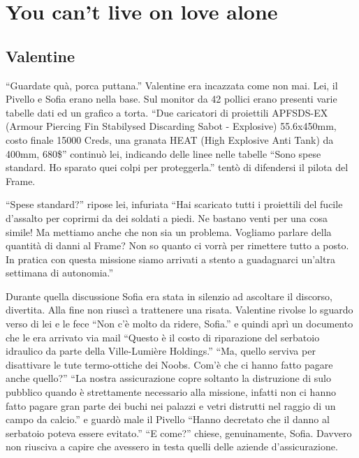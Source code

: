 \chapter{You can't live on love alone}

  \section*{Valentine}

    ``Guardate quà, porca puttana.'' Valentine era incazzata come non mai. Lei, il Pivello e Sofia erano nella base. Sul
    monitor da 42 pollici erano presenti varie tabelle dati ed un grafico a torta. ``Due caricatori di proiettili
    APFSDS-EX (Armour Piercing Fin Stabilysed Discarding Sabot - Explosive) 55.6x450mm, costo finale 15000 Creds, una
    granata HEAT (High Explosive Anti Tank) da 400mm, 680\$'' continuò lei, indicando delle linee nelle tabelle ``Sono
    spese standard. Ho sparato quei colpi per proteggerla.'' tentò di difendersi il pilota del Frame.
    
    ``Spese standard?'' ripose lei, infuriata ``Hai scaricato tutti i proiettili del fucile d'assalto per coprirmi da
    dei soldati a piedi. Ne bastano venti per una cosa simile! Ma mettiamo anche che non sia un problema. Vogliamo
    parlare della quantità di danni al Frame? Non so quanto ci vorrà per rimettere tutto a posto. In pratica con questa
    missione siamo arrivati a stento a guadagnarci un'altra settimana di autonomia.''

    Durante quella discussione Sofia era stata in silenzio ad ascoltare il discorso, divertita. Alla fine non riuscì a
    trattenere una risata. Valentine rivolse lo sguardo verso di lei e le fece ``Non c'è molto da ridere, Sofia.'' e
    quindi aprì un documento che le era arrivato via mail ``Questo è il costo di riparazione del serbatoio idraulico da
    parte della Ville-Lumière Holdings.'' ``Ma, quello serviva per disattivare le tute termo-ottiche dei Noobs. Com'è
    che ci hanno fatto pagare anche quello?'' ``La nostra assicurazione copre soltanto la distruzione di sulo pubblico
    quando è strettamente necessario alla missione, infatti non ci hanno fatto pagare gran parte dei buchi nei palazzi e
    vetri distrutti nel raggio di un campo da calcio.'' e guardò male il Pivello ``Hanno decretato che il danno al
    serbatoio poteva essere evitato.'' ``E come?'' chiese, genuinamente, Sofia. Davvero non riusciva a capire che
    avessero in testa quelli delle aziende d'assicurazione.

